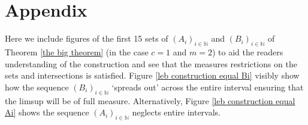 \documentclass[12pt]{article}
\begin{document}




\section*{Appendix}

Here we include figures of the first 15 sets of $(A_i)_{i \in \mathbb{N}}$ and $(B_i)_{i \in \mathbb{N}}$ of Theorem \ref{the big theorem} (in the case $c=1$ and $m=2$) to aid the readers understanding of the construction and see that the measures restrictions on the sets and intersections is satisfied. Figure \ref{leb construction equal Bi} visibly show how the sequence $(B_i)_{i \in \mathbb{N}}$ `spreads out' across the entire interval ensuring that the limsup will be of full measure. Alternatively, Figure \ref{leb construction equal Ai} shows the sequence $(A_i)_{i \in \mathbb{N}}$ neglects entire intervals.
\end{document}
